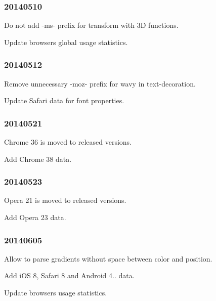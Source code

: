 \subsubsection*{20140510}


\begin{DoxyItemize}
\item Do not add {\ttfamily -\/ms-\/} prefix for {\ttfamily transform} with 3D functions.
\item Update browsers global usage statistics.
\end{DoxyItemize}

\subsubsection*{20140512}


\begin{DoxyItemize}
\item Remove unnecessary {\ttfamily -\/moz-\/} prefix for {\ttfamily wavy} in {\ttfamily text-\/decoration}.
\item Update Safari data for font properties.
\end{DoxyItemize}

\subsubsection*{20140521}


\begin{DoxyItemize}
\item Chrome 36 is moved to released versions.
\item Add Chrome 38 data.
\end{DoxyItemize}

\subsubsection*{20140523}


\begin{DoxyItemize}
\item Opera 21 is moved to released versions.
\item Add Opera 23 data.
\end{DoxyItemize}

\subsubsection*{20140605}


\begin{DoxyItemize}
\item Allow to parse gradients without space between color and position.
\item Add i\+OS 8, Safari 8 and Android 4.. data.
\item Update browsers usage statistics.
\end{DoxyItemize}

